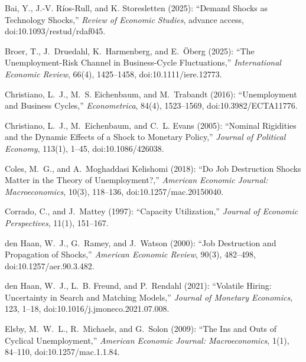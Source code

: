 \documentclass[authoryear, review, 12pt]{elsarticle}
\begin{document}
\begin{thebibliography}{}
Bai, Y., J.-V. R{\'i}os-Rull, and K. Storesletten (2025): ``Demand Shocks as Technology Shocks,'' \emph{Review of Economic Studies}, advance access, doi:10.1093/restud/rdaf045.

Broer, T., J.~Druedahl, K.~Harmenberg, and E.~{\"O}berg (2025): ``The Unemployment-Risk Channel in Business-Cycle Fluctuations,'' \emph{International Economic Review}, 66(4), 1425--1458, doi:10.1111/iere.12773.

Christiano, L.~J., M.~S. Eichenbaum, and M.~Trabandt (2016): ``Unemployment and Business Cycles,'' \emph{Econometrica}, 84(4), 1523--1569, doi:10.3982/ECTA11776.

Christiano, L.~J., M.~Eichenbaum, and C.~L. Evans (2005): ``Nominal Rigidities and the Dynamic Effects of a Shock to Monetary Policy,'' \emph{Journal of Political Economy}, 113(1), 1--45, doi:10.1086/426038.

Coles, M.~G., and A.~Moghaddasi Kelishomi (2018): ``Do Job Destruction Shocks Matter in the Theory of Unemployment?,'' \emph{American Economic Journal: Macroeconomics}, 10(3), 118--136, doi:10.1257/mac.20150040.

Corrado, C., and J.~Mattey (1997): ``Capacity Utilization,'' \emph{Journal of Economic Perspectives}, 11(1), 151--167.

den Haan, W.~J., G.~Ramey, and J.~Watson (2000): ``Job Destruction and Propagation of Shocks,'' \emph{American Economic Review}, 90(3), 482--498, doi:10.1257/aer.90.3.482.

den Haan, W.~J., L.~B. Freund, and P.~Rendahl (2021): ``Volatile Hiring: Uncertainty in Search and Matching Models,'' \emph{Journal of Monetary Economics}, 123, 1--18, doi:10.1016/j.jmoneco.2021.07.008.

Elsby, M.~W.~L., R.~Michaels, and G.~Solon (2009): ``The Ins and Outs of Cyclical Unemployment,'' \emph{American Economic Journal: Macroeconomics}, 1(1), 84--110, doi:10.1257/mac.1.1.84.


\end{thebibliography}
\end{document}
